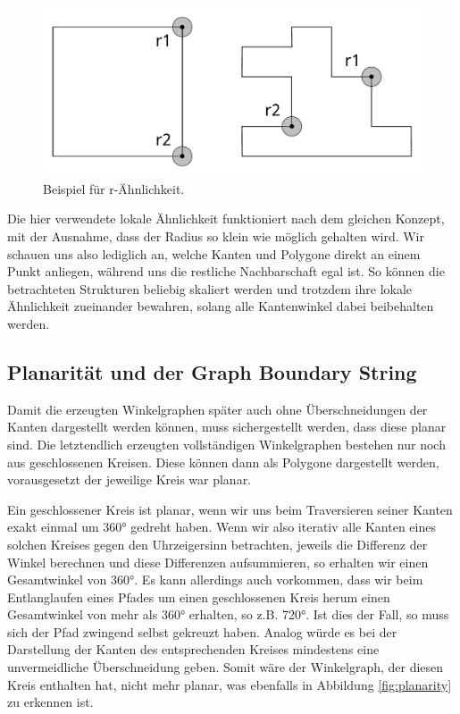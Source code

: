 \begin{figure}[t]
    \centering
    \includegraphics[height=\imgHeight]{images/rsimilarity.pdf}
    \caption{Beispiel für r-Ähnlichkeit.}
    \label{fig:rsimilarity}
\end{figure}

Die hier verwendete lokale Ähnlichkeit funktioniert nach dem gleichen Konzept, mit der Ausnahme, dass der Radius so klein wie möglich gehalten
wird. Wir schauen uns also lediglich an, welche Kanten und Polygone direkt an einem Punkt anliegen, während uns die restliche Nachbarschaft
egal ist. So können die betrachteten Strukturen beliebig skaliert werden und trotzdem ihre lokale Ähnlichkeit zueinander bewahren, solang alle
Kantenwinkel dabei beibehalten werden.

\subsection{Planarität und der Graph Boundary String}
Damit die erzeugten Winkelgraphen später auch ohne Überschneidungen der Kanten dargestellt werden können, muss sichergestellt werden, dass diese
planar sind. Die letztendlich erzeugten vollständigen Winkelgraphen bestehen nur noch aus geschlossenen Kreisen. Diese können dann als Polygone
dargestellt werden, vorausgesetzt der jeweilige Kreis war planar.

Ein geschlossener Kreis ist planar, wenn wir uns beim Traversieren seiner Kanten exakt einmal um 360° gedreht haben. Wenn wir also iterativ
alle Kanten eines solchen Kreises gegen den Uhrzeigersinn betrachten, jeweils die Differenz der Winkel berechnen und diese Differenzen
aufsummieren, so erhalten wir einen Gesamtwinkel von 360°. Es kann allerdings auch vorkommen, dass wir beim Entlanglaufen eines Pfades um
einen geschlossenen Kreis herum einen Gesamtwinkel von mehr als 360° erhalten, so z.B. 720°. Ist dies der Fall, so muss sich der Pfad zwingend
selbst gekreuzt haben. Analog würde es bei der Darstellung der Kanten des entsprechenden Kreises mindestens eine unvermeidliche Überschneidung
geben. Somit wäre der Winkelgraph, der diesen Kreis enthalten hat, nicht mehr planar, was ebenfalls in Abbildung \ref{fig:planarity} zu erkennen ist.

